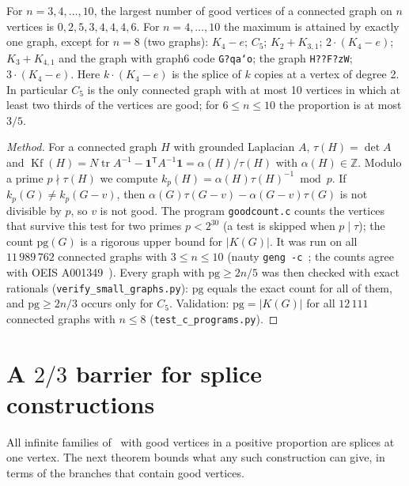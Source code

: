 \documentclass[11pt,a4paper]{report}
\newcommand*{\Kf}{\operatorname{Kf}}
\begin{document}
\begin{proposition}[note=computer-assisted]\label{prop:small}
For \(n=3,4,\dots,10\), the largest number of good vertices of a connected graph on \(n\) vertices is
\(0,2,5,3,4,4,4,6\). For \(n=4,\dots,10\) the maximum is attained by exactly one graph, except for \(n=8\) (two
graphs): \(K_4-e\); \(C_5\); \(K_2+K_{3,1}\); \(2\cdot(K_4-e)\); \(K_3+K_{4,1}\) and the graph with graph6 code
\texttt{G?qa`o}; the graph \texttt{H??F?zW}; \(3\cdot(K_4-e)\). Here \(k\cdot(K_4-e)\) is the splice of \(k\) copies at
a vertex of degree 2. In particular \(C_5\) is the only connected graph with at most 10 vertices in which at least two
thirds of the vertices are good; for \(6\le n\le10\) the proportion is at most \(3/5\).
\end{proposition}
\begin{proof}[Method]
For a connected graph \(H\) with grounded Laplacian \(A\), \(\tau(H)=\det A\) and \(\Kf(H)=N\operatorname{tr}A^{-1}
-\mathbf1^{\mathsf T}A^{-1}\mathbf1=\alpha(H)/\tau(H)\) with \(\alpha(H)\in\mathbb Z\). Modulo a prime \(p\nmid\tau(H)\)
we compute \(k_p(H)=\alpha(H)\tau(H)^{-1}\bmod p\). If \(k_p(G)\neq k_p(G-v)\), then
\(\alpha(G)\tau(G-v)-\alpha(G-v)\tau(G)\) is not divisible by \(p\), so \(v\) is not good. The program
\texttt{goodcount.c} counts the vertices that survive this test for two primes \(p<2^{30}\) (a test is skipped when
\(p\mid\tau\)); the count \(\mathrm{pg}(G)\) is a rigorous upper bound for \(|K(G)|\). It was run on all
\(11\,989\,762\) connected graphs with \(3\le n\le10\) (nauty \texttt{geng -c}~\autocite{McKayPiperno2014}; the
counts agree with OEIS A001349~\autocite{OEISA001349}). Every graph with \(\mathrm{pg}\ge2n/5\) was then checked with
exact rationals (\texttt{verify\_small\_graphs.py}): \(\mathrm{pg}\) equals the exact count for all of them, and
\(\mathrm{pg}\ge2n/3\) occurs only for \(C_5\). Validation: \(\mathrm{pg}=|K(G)|\) for all \(12\,111\) connected graphs
with \(n\le8\) (\texttt{test\_c\_programs.py}).
\end{proof}

\section{A \texorpdfstring{\(2/3\)}{2/3} barrier for splice constructions}\label{sec:barrier}

All infinite families of~\autocite{GMD2026,MG2025} with good vertices in a positive proportion are splices at one
vertex. The next theorem bounds what any such construction can give, in terms of the branches that contain good
vertices.
\end{document}
